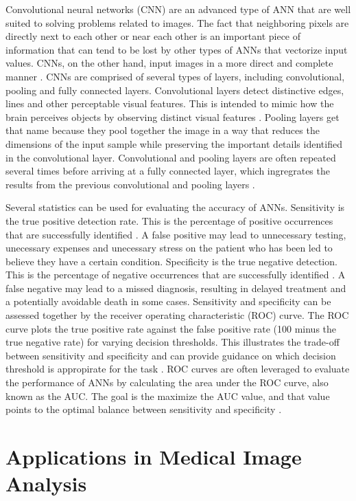 \documentclass[sigconf]{acmart}
\begin{document}
Convolutional neural networks (CNN) are an advanced type of ANN that are well suited to solving problems related to images. The fact that neighboring pixels are directly next to each other or near each other is an important piece of information that can tend to be lost by other types of ANNs that vectorize input values. CNNs, on the other hand, input images in a more direct and complete manner \cite{cite06}. CNNs are comprised of several types of layers, including convolutional, pooling and fully connected layers. Convolutional layers detect distinctive edges, lines and other perceptable visual features. This is intended to mimic how the brain perceives objects by observing distinct visual features \cite{cite05}. Pooling layers get that name because they pool together the image in a way that reduces the dimensions of the input sample while preserving the important details identified in the convolutional layer. Convolutional and pooling layers are often repeated several times before arriving at a fully connected layer, which ingregrates the results from the previous convolutional and pooling layers \cite{cite05}.

Several statistics can be used for evaluating the accuracy of ANNs. Sensitivity is the true positive detection rate. This is the percentage of positive occurrences that are successfully identified \cite{cite11}. A false positive may lead to unnecessary testing, unecessary expenses and unecessary stress on the patient who has been led to believe they have a certain condition. Specificity is the true negative detection. This is the percentage of negative occurrences that are successfully identified \cite{cite11}. A false negative may lead to a missed diagnosis, resulting in delayed treatment and a potentially avoidable death in some cases. Sensitivity and specificity can be assessed together by the receiver operating characteristic (ROC) curve. The ROC curve plots the true positive rate against the false positive rate (100 minus the true negative rate) for varying decision thresholds. This illustrates the trade-off between sensitivity and specificity and can provide guidance on which decision threshold is appropirate for the task \cite{cite11}. ROC curves are often leveraged to evaluate the performance of ANNs by calculating the area under the ROC curve, also known as the AUC. The goal is the maximize the AUC value, and that value points to the optimal balance between sensitivity and specificity \cite{cite11}.

\section{Applications in Medical Image Analysis}
\end{document}
